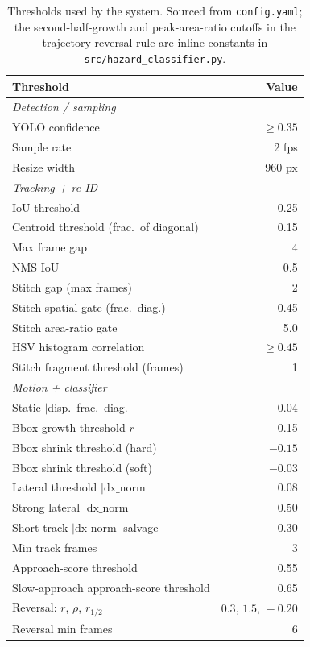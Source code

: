 \documentclass[10pt,twocolumn,letterpaper]{article}
\begin{document}
\begin{table}[h]
  \centering\footnotesize
  \caption{Thresholds used by the system. Sourced from
  \texttt{config.yaml}; the second-half-growth and peak-area-ratio
  cutoffs in the trajectory-reversal rule are inline constants in
  \texttt{src/hazard\_classifier.py}.}
  \label{tab:hyp}
  \begin{tabular}{lr}
    \toprule
    \textbf{Threshold} & \textbf{Value} \\
    \midrule
    \multicolumn{2}{l}{\emph{Detection / sampling}}\\
    YOLO confidence                          & $\geq 0.35$ \\
    Sample rate                              & 2 fps \\
    Resize width                             & 960 px \\
    \midrule
    \multicolumn{2}{l}{\emph{Tracking + re-ID}}\\
    IoU threshold                            & 0.25 \\
    Centroid threshold (frac.\ of diagonal)  & 0.15 \\
    Max frame gap                            & 4 \\
    NMS IoU                                  & 0.5 \\
    Stitch gap (max frames)                  & 2 \\
    Stitch spatial gate (frac.\ diag.)       & 0.45 \\
    Stitch area-ratio gate                   & 5.0 \\
    HSV histogram correlation                & $\geq 0.45$ \\
    Stitch fragment threshold (frames)       & 1 \\
    \midrule
    \multicolumn{2}{l}{\emph{Motion + classifier}}\\
    Static $|$disp.\ frac.\ diag.\           & 0.04 \\
    Bbox growth threshold $r$                & 0.15 \\
    Bbox shrink threshold (hard)             & $-0.15$ \\
    Bbox shrink threshold (soft)             & $-0.03$ \\
    Lateral threshold $|\textrm{dx\_norm}|$  & 0.08 \\
    Strong lateral $|\textrm{dx\_norm}|$     & 0.50 \\
    Short-track $|\textrm{dx\_norm}|$ salvage & 0.30 \\
    Min track frames                         & 3 \\
    Approach-score threshold                 & 0.55 \\
    Slow-approach approach-score threshold   & 0.65 \\
    Reversal: $r$, $\rho$, $r_{1/2}$         & $0.3,\,1.5,\,-0.20$ \\
    Reversal min frames                      & 6 \\
    \bottomrule
  \end{tabular}
\end{table}
\end{document}
